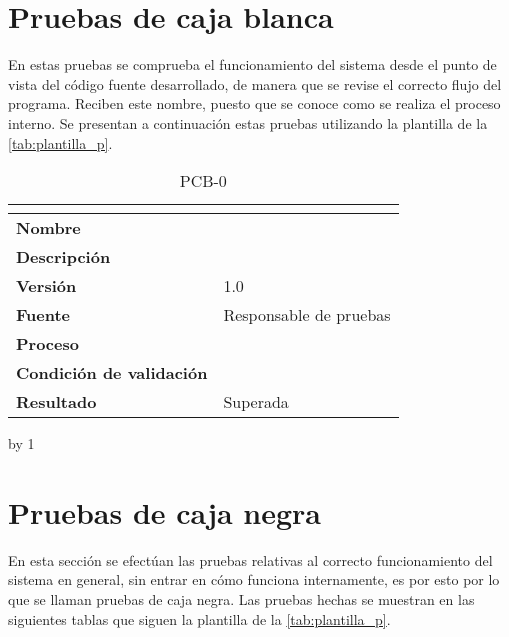 \section{Pruebas de caja blanca}
En estas pruebas se comprueba el funcionamiento del sistema desde el punto de vista del código fuente desarrollado, de manera que se revise el correcto flujo del programa. Reciben este nombre, puesto que se conoce como se realiza el proceso interno. Se presentan a continuación estas pruebas utilizando la plantilla de la \autoref{tab:plantilla_p}. 

\newcount\pcb
{}
\begin{table}[H]
	\caption{PCB-0\number\pcb}
	\begin{tabular}{|l|p{}|}
		\hline
		\multicolumn{2}{|c|}{\cellcolor[HTML]{BFBFBF}{\color[HTML]{000000} \textbf{PCB-0\number\pcb}}} \\ \hline
		\textbf{Nombre}                  &   \\ \hline
		\textbf{Descripción}             &   \\ \hline
		\textbf{Versión}                 & 1.0  \\ \hline
		\textbf{Fuente}                  & Responsable de pruebas  \\ \hline
		\textbf{Proceso}                 &   \\ \hline
		\textbf{Condición de validación} &   \\ \hline
		\textbf{Resultado}               & Superada  \\ \hline
	\end{tabular}
\end{table}
\advance\pcb by 1

\section{Pruebas de caja negra}
En esta sección se efectúan las pruebas relativas al correcto funcionamiento del sistema en general, sin entrar en cómo funciona internamente, es por esto por lo que se llaman pruebas de caja negra. Las pruebas hechas se muestran en las siguientes tablas que siguen la plantilla de la \autoref{tab:plantilla_p}.

